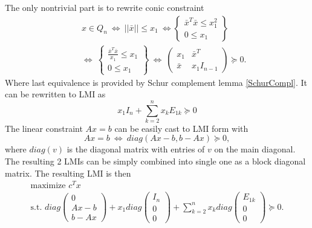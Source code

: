 \documentclass[10pt,oneside]{book}
\theoremstyle{definition}
\begin{document}
The only nontrivial part is to rewrite conic constraint 
\begin{eqnarray}
& &x\in Q_n \ \Leftrightarrow  \ ||\bar{x}||\leq x_1 \ \Leftrightarrow  
\left\lbrace \begin{array}{r}
\bar{x}^T\bar{x}\leq x_1^2\\
0\leq x_1 
\end{array}\right\rbrace \\
 & &\Leftrightarrow \ 
 \left\lbrace \begin{array}{r}
\frac{\bar{x}^T\bar{x}}{x_1}\leq x_1\\
0\leq x_1 
\end{array}\right\rbrace 
 \ \Leftrightarrow  \ 
 \left( \begin{array}{cc}
x_1 & \bar{x}^T\\
\bar{x} & x_1I_{n-1}
\end{array}\right)\succeq 0.
\label{arrowx}
\end{eqnarray}
Where last equivalence is provided by Schur complement lemma \ref{SchurCompl}.
It can be rewritten to LMI as 
\begin{equation}
x_1I_n + \sum_{k=2}^n x_kE_{1k} \succeq 0
\end{equation}
The linear constraint $Ax = b$ can be easily cast to LMI form with
\begin{equation}
Ax=b \ \Leftrightarrow \ diag(Ax-b,b-Ax)\succeq 0,
\end{equation}
where $diag(v)$ is the diagonal matrix with entries of $v$ on the main diagonal.
The resulting 2 LMIs can be simply combined into single one as a block diagonal matrix. The resulting LMI is then
\begin{equation} 
\begin{array}{l}
\mbox{maximize \ }  c^Tx \\
\mbox{s.t. \ }
 diag\left(\begin{array}{c} 0 \\ Ax-b \\b-Ax  \end{array}\right) 
 +  x_1diag\left(\begin{array}{c} I_n \\ 0 \\0  \end{array}\right)
 + \sum_{k=2}^n x_kdiag\left(\begin{array}{c} E_{1k} \\0 \\0  \end{array}\right)\succeq 0.
 \end{array}	
\end{equation}  
\end{document}
